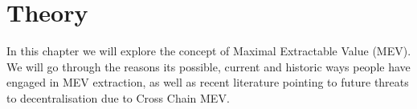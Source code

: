 \chapter{Theory}

In this chapter we will explore the concept of Maximal Extractable Value (MEV). We will go through the reasons its possible, current and historic ways people have engaged in MEV extraction, as well as recent literature pointing to future threats to decentralisation due to Cross Chain MEV. 